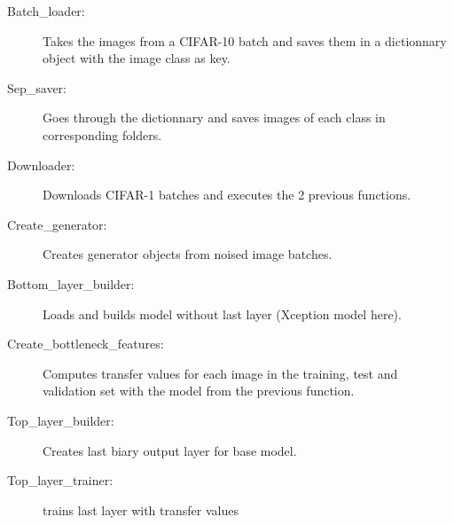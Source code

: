 \documentclass[11 pt]{article}
\begin{document}
\begin{appendices}
  \begin{description}
    \item[Batch\_loader:] Takes the images from a CIFAR-10 batch and saves them in a dictionnary object with the image class as key.
    \item[Sep\_saver:] Goes through the dictionnary and saves images of each class in corresponding folders.
    \item[Downloader:] Downloads CIFAR-1 batches and executes the 2 previous functions.
    \item[Create\_generator:] Creates generator objects from noised image batches.
    \item[Bottom\_layer\_builder:] Loads and builds model without last layer (Xception model here).
    \item[Create\_bottleneck\_features:] Computes transfer values for each image in the training, test and validation set with the model from the previous function.
    \item[Top\_layer\_builder:] Creates last biary output layer for base model.
    \item[Top\_layer\_trainer:] trains last layer with transfer values

\end{description}
\end{appendices}
\end{document}
